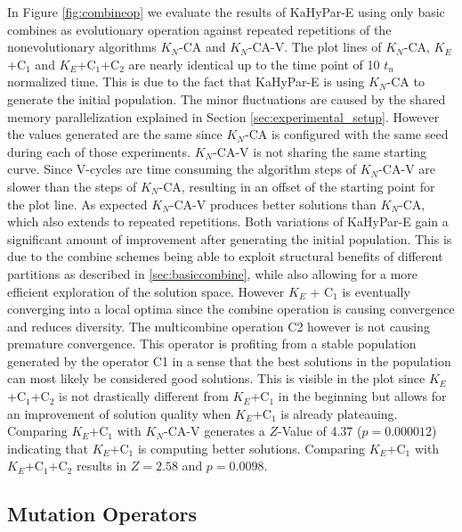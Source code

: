 \documentclass[a4paper,12pt,titlepage, BCOR7mm,headsepline]{scrbook}
\numberwithin{equation}{section}
\begin{document}
In Figure \ref{fig:combineop} we evaluate the results of KaHyPar-E using only basic combines as evolutionary operation against repeated repetitions of the nonevolutionary algorithms $K_N$-CA and $K_N$-CA-V. The plot lines of $K_N$-CA, $K_E$+C$_1$ and $K_E$+C$_1$+C$_2$ are nearly identical up to the time point of 10 $t_n$ normalized time. This is due to the fact that KaHyPar-E is using $K_N$-CA to generate the initial population. The minor fluctuations are caused by the shared memory parallelization explained in Section \ref{sec:experimental_setup}. However the values generated are the same since $K_N$-CA is configured with the same seed during each of those experiments. $K_N$-CA-V is not sharing the same starting curve. Since V-cycles are time consuming the algorithm steps of $K_N$-CA-V are slower than the steps of $K_N$-CA, resulting in an offset of the starting point for the plot line. As expected $K_N$-CA-V produces better solutions than $K_N$-CA, which also extends to repeated repetitions. Both variations of KaHyPar-E gain a significant amount of improvement after generating the initial population. This is due to the combine schemes being able to exploit structural benefits of different partitions as described in \ref{sec:basiccombine}, while also allowing for a more efficient exploration of the solution space. However $K_E$ + C$_1$ is eventually converging into a local optima since the combine operation is causing convergence and reduces diversity. The multicombine operation C2 however is not causing premature convergence. This operator is profiting from a stable population generated by the operator C1 in a sense that the best solutions in the population can most likely be considered good solutions. This is visible in the plot since $K_E$+C$_1$+C$_2$ is not drastically different from $K_E$+C$_1$ in the beginning but allows for an improvement of solution quality when $K_E$+C$_1$ is already plateauing. Comparing $K_E$+C$_1$ with $K_N$-CA-V generates a $Z$-Value of 4.37 ($p = 0.000012$) indicating that $K_E$+C$_1$ is computing better solutions. Comparing $K_E$+C$_1$ with $K_E$+C$_1$+C$_2$ results in $Z = 2.58$ and $p = 0.0098$. 
\subsection{Mutation Operators}
\end{document}
